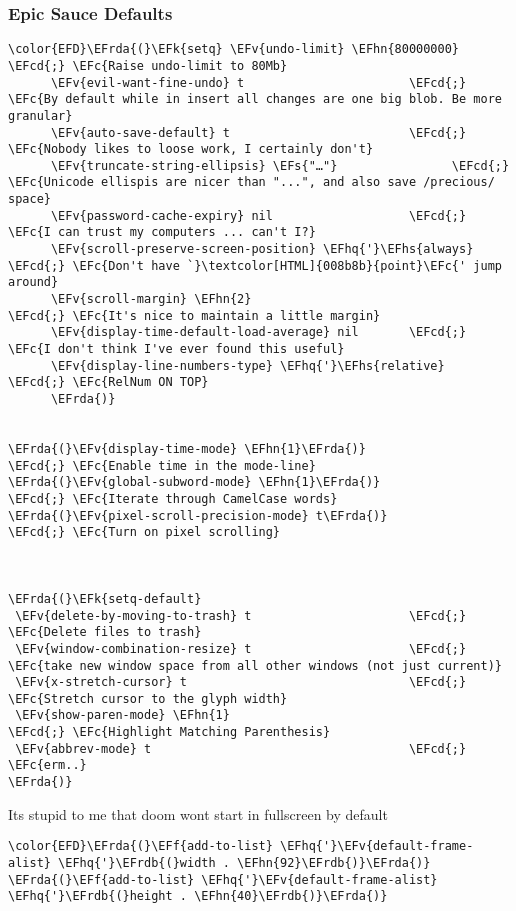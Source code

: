 \documentclass{article}
\newcommand{\EFc}[1]{\textcolor{EFc}{#1}} %
\newcommand{\EFcd}[1]{\textcolor{EFcd}{#1}} %
\newcommand{\EFs}[1]{\textcolor{EFs}{#1}} %
\newcommand{\EFk}[1]{\textcolor{EFk}{#1}} %
\newcommand{\EFf}[1]{\textcolor{EFf}{#1}} %
\newcommand{\EFv}[1]{\textcolor{EFv}{#1}} %
\newcommand{\EFhn}[1]{\textcolor{EFhn}{\textbf{#1}}} %
\newcommand{\EFhq}[1]{#1} %
\newcommand{\EFhs}[1]{\textcolor{EFhs}{#1}} %
\newcommand{\EFrda}[1]{\textcolor{EFrda}{#1}} %
\newcommand{\EFrdb}[1]{\textcolor{EFrdb}{#1}} %
\begin{document}
\subsubsection{Epic Sauce Defaults}
\label{sec:org7db4465}
\begin{Code}
\begin{Verbatim}
\color{EFD}\EFrda{(}\EFk{setq} \EFv{undo-limit} \EFhn{80000000}                         \EFcd{;} \EFc{Raise undo-limit to 80Mb}
      \EFv{evil-want-fine-undo} t                       \EFcd{;} \EFc{By default while in insert all changes are one big blob. Be more granular}
      \EFv{auto-save-default} t                         \EFcd{;} \EFc{Nobody likes to loose work, I certainly don't}
      \EFv{truncate-string-ellipsis} \EFs{"…"}                \EFcd{;} \EFc{Unicode ellispis are nicer than "...", and also save /precious/ space}
      \EFv{password-cache-expiry} nil                   \EFcd{;} \EFc{I can trust my computers ... can't I?}
      \EFv{scroll-preserve-screen-position} \EFhq{'}\EFhs{always}     \EFcd{;} \EFc{Don't have `}\textcolor[HTML]{008b8b}{point}\EFc{' jump around}
      \EFv{scroll-margin} \EFhn{2}                             \EFcd{;} \EFc{It's nice to maintain a little margin}
      \EFv{display-time-default-load-average} nil       \EFcd{;} \EFc{I don't think I've ever found this useful}
      \EFv{display-line-numbers-type} \EFhq{'}\EFhs{relative}         \EFcd{;} \EFc{RelNum ON TOP}
      \EFrda{)}


\EFrda{(}\EFv{display-time-mode} \EFhn{1}\EFrda{)}                             \EFcd{;} \EFc{Enable time in the mode-line}
\EFrda{(}\EFv{global-subword-mode} \EFhn{1}\EFrda{)}                           \EFcd{;} \EFc{Iterate through CamelCase words}
\EFrda{(}\EFv{pixel-scroll-precision-mode} t\EFrda{)}                   \EFcd{;} \EFc{Turn on pixel scrolling}



\EFrda{(}\EFk{setq-default}
 \EFv{delete-by-moving-to-trash} t                      \EFcd{;} \EFc{Delete files to trash}
 \EFv{window-combination-resize} t                      \EFcd{;} \EFc{take new window space from all other windows (not just current)}
 \EFv{x-stretch-cursor} t                               \EFcd{;} \EFc{Stretch cursor to the glyph width}
 \EFv{show-paren-mode} \EFhn{1}                                \EFcd{;} \EFc{Highlight Matching Parenthesis}
 \EFv{abbrev-mode} t                                    \EFcd{;} \EFc{erm..}
\EFrda{)}
\end{Verbatim}
\end{Code}
Its stupid to me that doom wont start in fullscreen by default
\begin{Code}
\begin{Verbatim}
\color{EFD}\EFrda{(}\EFf{add-to-list} \EFhq{'}\EFv{default-frame-alist} \EFhq{'}\EFrdb{(}width . \EFhn{92}\EFrdb{)}\EFrda{)}
\EFrda{(}\EFf{add-to-list} \EFhq{'}\EFv{default-frame-alist} \EFhq{'}\EFrdb{(}height . \EFhn{40}\EFrdb{)}\EFrda{)}
\end{Verbatim}
\end{Code}
\end{document}
